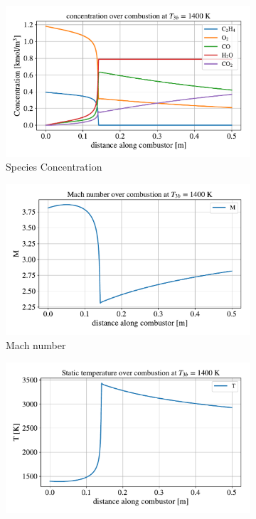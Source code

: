 \documentclass[a4paper]{article}
\begin{document}
\begin{figure}[h]
    \centering
    \begin{subfigure}[h]{0.49\linewidth}
        \includegraphics[width=\linewidth]{part_2_img/concentration_1400.pdf}
        \caption{Species Concentration}
        \label{subfig:concentration_1400}
    \end{subfigure}
    \begin{subfigure}[h]{0.49\linewidth}
        \includegraphics[width=\linewidth]{part_2_img/mach_1400.pdf}
        \caption{Mach number}
        \label{subfig:mach_1400}
    \end{subfigure}
    \begin{subfigure}[h]{0.49\linewidth}
        \includegraphics[width=\linewidth]{part_2_img/static_temp_1400.pdf}

\end{subfigure}
\end{figure}
\end{document}
